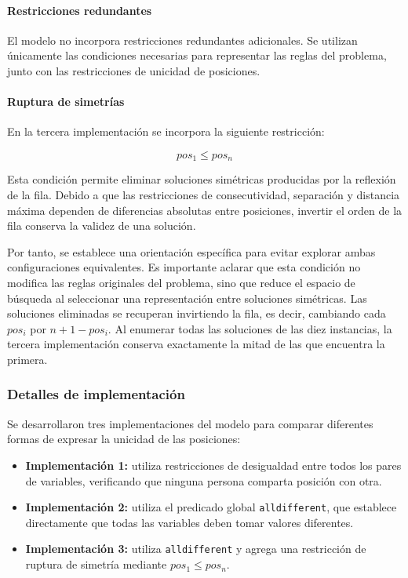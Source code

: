 \paragraph{Restricciones redundantes}

El modelo no incorpora restricciones redundantes adicionales. Se utilizan únicamente las condiciones necesarias para representar las reglas del problema, junto con las restricciones de unicidad de posiciones.

\paragraph{Ruptura de simetrías}

En la tercera implementación se incorpora la siguiente restricción:

\[
pos_1 \leq pos_n
\]

Esta condición permite eliminar soluciones simétricas producidas por la reflexión de la fila. Debido a que las restricciones de consecutividad, separación y distancia máxima dependen de diferencias absolutas entre posiciones, invertir el orden de la fila conserva la validez de una solución.

Por tanto, se establece una orientación específica para evitar explorar ambas configuraciones equivalentes. Es importante aclarar que esta condición no modifica las reglas originales del problema, sino que reduce el espacio de búsqueda al seleccionar una representación entre soluciones simétricas. Las soluciones eliminadas se recuperan invirtiendo la fila, es decir, cambiando cada $pos_i$ por $n + 1 - pos_i$. Al enumerar todas las soluciones de las diez instancias, la tercera implementación conserva exactamente la mitad de las que encuentra la primera.

\subsubsection{Detalles de implementación}

Se desarrollaron tres implementaciones del modelo para comparar diferentes formas de expresar la unicidad de las posiciones:

\begin{itemize}
    \item \textbf{Implementación 1:} utiliza restricciones de desigualdad entre todos los pares de variables, verificando que ninguna persona comparta posición con otra.

    \item \textbf{Implementación 2:} utiliza el predicado global \texttt{alldifferent}, que establece directamente que todas las variables deben tomar valores diferentes.

    \item \textbf{Implementación 3:} utiliza \texttt{alldifferent} y agrega una restricción de ruptura de simetría mediante $pos_1 \leq pos_n$.
\end{itemize}

